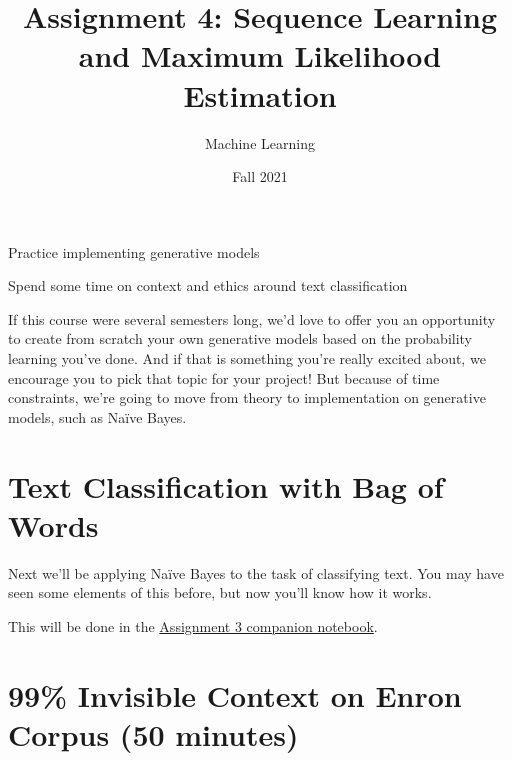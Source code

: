 \documentclass[assignment04_Solutions]{subfiles}
\title{Assignment 4: Sequence Learning and Maximum Likelihood Estimation}
\author{Machine Learning}
\date{Fall 2021}
\begin{document}
\maketitle
\thispagestyle{firstpage}


\begin{learningobjectives}
\bi
\item Practice implementing generative models
\item Spend some time on context and ethics around text classification
\ei
\end{learningobjectives}

If this course were several semesters long, we'd love to offer you an opportunity to create from scratch your own generative models based on the probability learning you've done. And if that is something you're really excited about, we encourage you to pick that topic for your project! But because of time constraints, we're going to move from theory to implementation on generative models, such as Na\"ive Bayes.





\section{Text Classification with Bag of Words}
Next we'll be applying Na\"ive Bayes to the task of classifying text. You may have seen some elements of this before, but now you'll know how it works.



\begin{externalresources}[(60 minutes)]
This will be done in the \href{https://colab.research.google.com/drive/15A8PncIi8zY_SscJdKK8GMrpSynJVucK?usp=sharing}{Assignment 3 companion notebook}.
\end{externalresources}



\section{99\% Invisible Context on Enron Corpus (50 minutes)}
\end{document}
